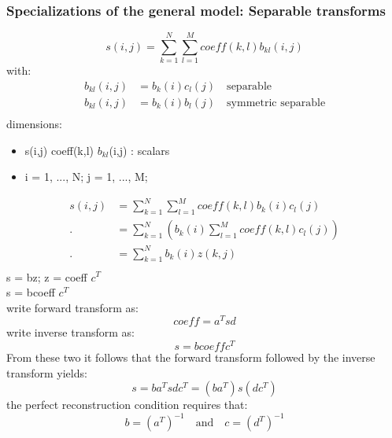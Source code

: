 \documentclass{article}
\begin{document}
\subsubsection{Specializations of the general model: Separable transforms}
\begin{equation}
    s(i, j) = \sum_{k=1}^{N}\sum_{l=1}^{M}coeff(k, l) b_{kl}(i,j)
\end{equation}
with:
\begin{equation}
    \begin{split}
        b_{kl}(i,j) &= b_k(i)c_l(j) \quad \textrm{separable} \\
        b_{kl}(i,j) &= b_k(i) b_l(j) \quad \textrm{symmetric separable} \\
    \end{split}
\end{equation}
dimensions:
\begin{itemize}
    \item s(i,j) coeff(k,l) $b_{kl}$(i,j) : scalars
    \item i = 1, ..., N; j = 1, ..., M;
\end{itemize}
\pagebreak
\begin{equation}
    \begin{split}
        s(i,j) &= \sum_{k=1}^{N}\sum_{l=1}^{M}coeff(k,l) b_k(i) c_l(j) \\
       . &= \sum_{k=1}^{N}\left( b_k(i) \sum_{l=1}^{M}coeff(k,l) c_l(j)\right)\\
         . &= \sum_{k=1}^{N} b_k(i) z(k, j) \\
    \end{split}
\end{equation}
s = bz; z = coeff $c^T$ \\
s = bcoeff $c^T$ \\
write forward transform as:
\begin{equation}
    coeff = a^T s d
\end{equation}
write inverse transform as:
\begin{equation}
    s = b coeff c^T
\end{equation}
From these two it follows that the forward transform followed by the inverse transform yields:
\begin{equation}
    s = b a^T s d c^T = \left(b a^T\right) s \left(d c^T\right)
\end{equation}
the perfect reconstruction condition requires that:
\begin{equation}
    b = (a^T)^{-1} \quad \textrm{and} \quad c = (d^T)^{-1}
\end{equation}
\end{document}
